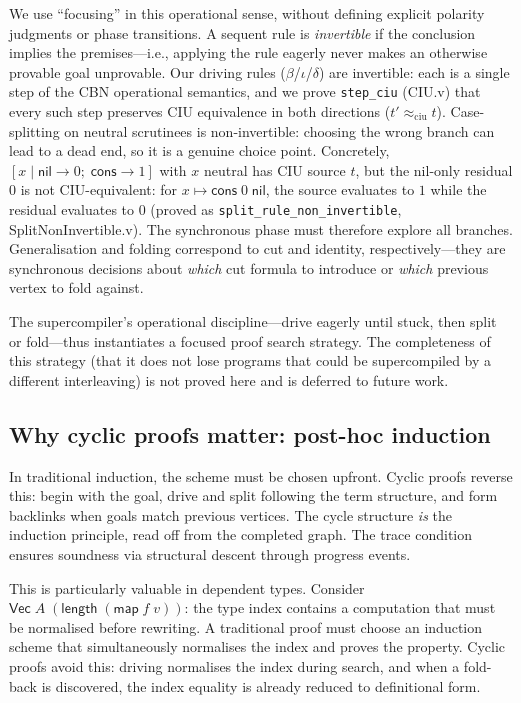 We use ``focusing'' in this operational sense, without defining explicit polarity judgments or phase transitions. A sequent rule is \emph{invertible} if the conclusion implies the premises---i.e., applying the rule eagerly never makes an otherwise provable goal unprovable. Our driving rules ($\beta$/$\iota$/$\delta$) are invertible: each is a single step of the CBN operational semantics, and we prove \texttt{step\_ciu} (CIU.v) that every such step preserves CIU equivalence in both directions ($t' \approx_{\mathrm{ciu}} t$). Case-splitting on neutral scrutinees is non-invertible: choosing the wrong branch can lead to a dead end, so it is a genuine choice point. Concretely, $[x \mid \mathsf{nil}\to 0;\; \mathsf{cons}\to 1]$ with $x$ neutral has CIU source $t$, but the nil-only residual $0$ is not CIU-equivalent: for $x\mapsto\mathsf{cons}\;0\;\mathsf{nil}$, the source evaluates to $1$ while the residual evaluates to $0$ (proved as \texttt{split\_rule\_non\_invertible}, SplitNonInvertible.v). The synchronous phase must therefore explore all branches. Generalisation and folding correspond to cut and identity, respectively---they are synchronous decisions about \emph{which} cut formula to introduce or \emph{which} previous vertex to fold against.

The supercompiler's operational discipline---drive eagerly until stuck, then split or fold---thus instantiates a focused proof search strategy. The completeness of this strategy (that it does not lose programs that could be supercompiled by a different interleaving) is not proved here and is deferred to future work.

\subsection{Why cyclic proofs matter: post-hoc induction}
\label{sec:thesis:cyclic}

In traditional induction, the scheme must be chosen upfront. Cyclic proofs reverse this: begin with the goal, drive and split following the term structure, and form backlinks when goals match previous vertices. The cycle structure \emph{is} the induction principle, read off from the completed graph. The trace condition ensures soundness via structural descent through progress events.

This is particularly valuable in dependent types. Consider $\mathsf{Vec}\;A\;(\mathsf{length}\;(\mathsf{map}\;f\;v))$: the type index contains a computation that must be normalised before rewriting. A traditional proof must choose an induction scheme that simultaneously normalises the index and proves the property. Cyclic proofs avoid this: driving normalises the index during search, and when a fold-back is discovered, the index equality is already reduced to definitional form.

